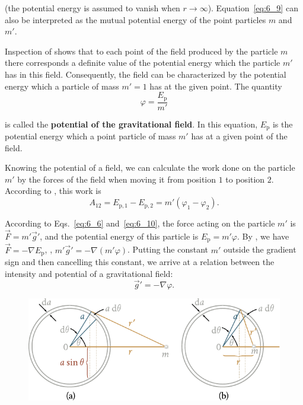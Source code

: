 \noindent
(the potential energy is assumed to vanish when $r\to\infty$). Equation~\eqref{eq:6_9} can also be interpreted as the mutual potential energy of the point particles $m$ and $m'$.

Inspection of  shows that to each point of the field produced by the particle $m$ there corresponds a definite value of the potential energy which the particle $m'$ has in this field. Consequently, the field can be characterized by the potential energy which a particle of mass $m'=1$ has at the given point. The quantity
\begin{equation}\label{eq:6_10}
	\varphi = \frac{E_{\text{p}}}{m'}
\end{equation}

\noindent
is called the \textbf{potential of the gravitational field}. In this equation, $E_{\text{p}}$ is the potential energy which a point particle of mass $m'$ has at a given point of the field.

Knowing the potential of a field, we can calculate the work done on the particle $m'$ by the forces of the field when moving it from position $1$ to position $2$. According to , this work is
\begin{equation}\label{eq:6_11}
	A_{12} = E_{\text{p},1} - E_{\text{p},2} = m'(\varphi_1 - \varphi_2).
\end{equation}

According to Eqs.~\eqref{eq:6_6} and~\eqref{eq:6_10}, the force acting on the particle $m'$ is $\vec{F}=m'\vec{g}'$, and the potential energy of this particle is $E_{\text{p}}=m'\varphi$. By , we have $\vec{F}=-\nabla E_{\text{p}}$, \ie, $m'\vec{g}'=-\nabla(m'\varphi)$. Putting the constant $m'$ outside the gradient sign and then cancelling this constant, we arrive at a relation between the intensity and potential of a gravitational field:
\begin{equation}\label{eq:6_12}
	\vec{g}' = -\nabla\varphi.
\end{equation}

\begin{figure}[t]
	\begin{center}
		\includegraphics[scale=0.95]{figures/ch_06/fig_6_4.pdf}
		\caption[]{}
		\label{fig:6_4}
	\end{center}
	\vspace{-0.7cm}
\end{figure}

